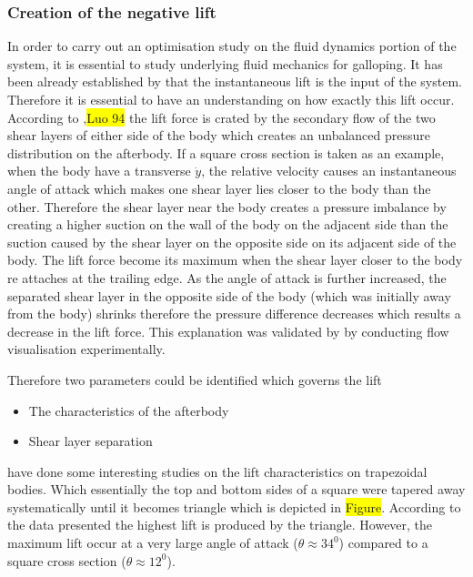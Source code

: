 \documentclass{article}
\newcommand{\hilight}[1]{\colorbox{yellow}{#1}}
\begin{document}
\subsubsection{Creation of the negative lift}

In order to carry out an optimisation study on the fluid dynamics portion of the system, it is essential to study underlying fluid mechanics for galloping. It has been already established by \cite{Parkinson1964} that the instantaneous lift is the input of the system. Therefore it is essential to have an understanding on how exactly this lift occur. According to \cite{Parkinson1989},\hilight{Luo 94} the lift force is crated by the secondary flow of the two shear layers of either side of the body which creates an unbalanced pressure distribution on the afterbody. If a square cross section is taken as an example, when the body have a transverse $\dot{y}$, the relative velocity causes an instantaneous angle of attack which makes one shear layer lies closer to the body than the other. Therefore the shear layer near the body creates a pressure imbalance by creating a higher suction on the wall of the body on the adjacent side than the suction caused by the shear layer on the opposite side on its adjacent side of the body. The lift force become its maximum when the shear layer closer to the body re attaches at the trailing edge. As the angle of attack is further increased, the separated shear layer in the opposite side of the body (which was initially away from the body) shrinks therefore the pressure difference decreases which results a decrease in the lift force. This explanation was validated by \cite{Luo1994} by conducting flow visualisation experimentally.

Therefore two parameters could be identified which governs the lift 

\begin{itemize}
\item{ The characteristics of the afterbody}
\item{Shear layer separation}
\end{itemize}
\cite{Luo1994} have done some interesting studies on the lift characteristics on trapezoidal bodies. Which essentially the top and bottom sides of a square were tapered away systematically until it becomes triangle which is depicted in \hilight{Figure}. According to the data presented \cite{Luo1994} the highest lift is produced by the triangle. However, the maximum lift occur at a very large angle of attack ($\theta\approx 34^0 $) compared to a square cross section ($\theta\approx 12^0 $).
\end{document}

